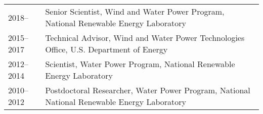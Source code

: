\documentclass[10pt]{article}
\begin{document}
\vspace{-0.1in}
\begin{tabular}{ll}
2018-- & Senior Scientist, Wind and Water Power Program, National Renewable Energy Laboratory\\
2015--2017 & Technical Advisor, Wind and Water Power Technologies Office, U.S. Department of Energy\\
2012--2014 & Scientist, Water Power Program, National Renewable Energy Laboratory\\
2010--2012 & Postdoctoral Researcher, Water Power Program, National National Renewable Energy Laboratory


\end{tabular}
\end{document}
